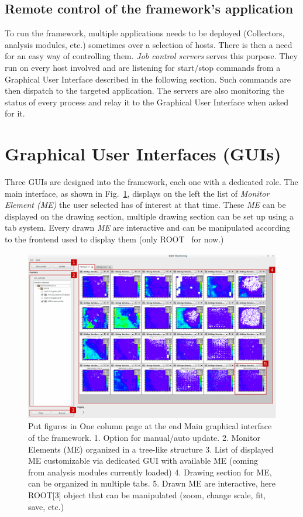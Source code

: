 \documentclass[conference]{IEEEtran}
\begin{document}
\subsection{Remote control of the framework's application}
To run the framework, multiple applications needs to be deployed (Collectors, analysis modules, etc.) sometimes over a selection of hosts. There is then a need for an easy way of controlling them. \textit{Job control servers} serves this purpose. They run on every host involved and are listening for start/stop commands from a Graphical User Interface described in the following section. Such commands are then dispatch to the targeted application. The servers are also monitoring the status of every process and relay it to the Graphical User Interface when asked for it.

\section{Graphical User Interfaces (GUIs)}

Three GUIs are designed into the framework, each one with a dedicated role. The main interface, as shown in Fig.~\ref{fig:DQMMainViz}, displays on the left the list of \textit{Monitor Element (ME)} the user selected has of interest at that time. These \textit{ME} can be displayed on the drawing section, multiple drawing section can be set up using a tab system. Every drawn \textit{ME} are interactive and can be manipulated according to the frontend used to display them (only ROOT~\cite{ROOT} for now.)
\begin{figure}[p]
  \begin{center}
    \includegraphics[width=0.8\linewidth]{figs/MaintInterfaceGUI.pdf}
    \caption{\label{fig:DQMMainViz} {\color{red}Put figures in One column page at the end}
    Main graphical interface of the framework.
    1. Option for manual/auto update.
    2. Monitor Elements (ME) organized in a tree-like structure
    3. List of displayed ME customizable via dedicated GUI with available ME (coming from analysis modules currently loaded)
    4. Drawing section for ME, can be organized in multiple tabs.
    5. Drawn ME are interactive, here ROOT[3] object that can be manipulated (zoom, change scale, fit, save, etc.)
    }
  \end{center}
\end{figure}
\end{document}

